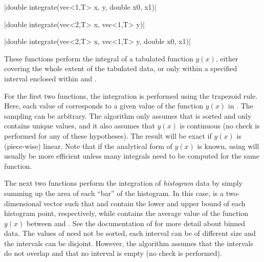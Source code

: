\cppinline|double integrate(vec<1,T> x, y, double x0, x1)|

\cppinline|double integrate(vec<2,T> x, vec<1,T> y)|

\cppinline|double integrate(vec<2,T> x, vec<1,T> y, double x0, x1)|

These functions perform the integral of a tabulated function $y(x)$, either covering the whole extent of the tabulated data, or only within a specified interval enclosed within  and .

For the first two functions, the integration is performed using the trapezoid rule. Here, each value of  corresponds to a given value of the function $y(x)$ in . The sampling can be arbitrary. The algorithm only assumes that  is sorted and only contains unique values, and it also assumes that $y(x)$ is continuous (no check is performed for any of these hypotheses). The result will be exact if $y(x)$ is (piece-wise) linear. Note that if the analytical form of $y(x)$ is known, using  will usually be more efficient unless many integrals need to be computed for the same function.

The next two functions perform the integration of \emph{histogram} data by simply summing up the area of each ``bar'' of the histogram. In this case,  is a two-dimensional vector such that  and  contain the lower and upper bound of each histogram point, respectively, while  contains the average value of the function $y(x)$ between  and . See the documentation of  for more detail about binned data. The values of  need not be sorted, each interval can be of different size and the intervals can be disjoint. However, the algorithm assumes that the intervals do not overlap and that no interval is empty (no check is performed).

